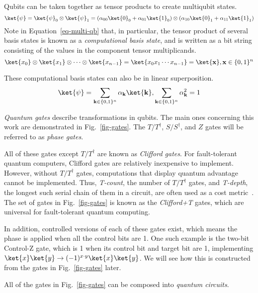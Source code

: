 Qubits can be taken together as tensor products to create multiqubit states.
\begin{equation}
\label{eq-multi-qb}
\ket{\psi} = \ket{\psi}_0 \otimes \ket{\psi}_1 =(\alpha_{00} \ket{0}_0 + \alpha_{01} \ket{1}_0) \otimes
(\alpha_{10} \ket{0}_1 + \alpha_{11} \ket{1}_1)
\end{equation}
Note in Equation~\ref{eq-multi-qb} that, in particular, the tensor product of several basis states is known as a \emph{computational basis state},
and is written as a bit string consisting of the values in the component tensor multiplicands.
\begin{equation}
\ket{x_0}\otimes\ket{x_1}\otimes\cdots\otimes\ket{x_{n-1}}=\ket{x_0 x_1 \cdots x_{n-1}}=\ket{\mathbf{x}},
\mathbf{x} \in \{0,1\}^n
\end{equation}

These computational basis states can also be in linear superposition.
\begin{equation}
\ket{\psi} = \sum_{\mathbf{k} \in \{0,1\}^n} \alpha_{\mathbf{k}}\ket{\mathbf{k}},
\sum_{\mathbf{k} \in \{0,1\}^n} \alpha_{\mathbf{k}}^2 = 1
\end{equation}

{\it Quantum gates} describe transformations in qubits. The main ones concerning this work
are demonstrated in Fig.~\ref{fig-gates}. The $T/T^{\dagger}$, $S/S^{\dagger}$, and $Z$
gates will be referred to as {\it phase gates}.

All of these gates except $T/T^{\dagger}$ are known as {\it Clifford gates}. For
fault-tolerant quantum computers, Clifford gates are relatively inexpensive to implement.
However, without $T/T^{\dagger}$ gates, computations that display quantum advantage
cannot be implemented. Thus, {\it T-count}, the number of $T/T^{\dagger}$ gates, and
{\it T-depth}, the longest such serial chain of them in a circuit, are often used as a
cost metric~\cite{amy-meet-in-middle}. The set of gates in Fig.~\ref{fig-gates} is known
as the {\it Clifford+T} gates, which are universal for fault-tolerant quantum computing.

In addition, controlled versions of each of these gates exist, which means the phase is
applied when all the control bits are 1. One such example is the two-bit Control-Z gate,
which is 1 when its control bit and target bit are 1, implementing
$\ket{x}\ket{y} \rightarrow (-1)^{x \cdot y}\ket{x}\ket{y}$. We will see how this is
constructed from the gates in Fig.~\ref{fig-gates} later.

All of the gates in Fig.~\ref{fig-gates} can be composed into
{\it quantum circuits}.

